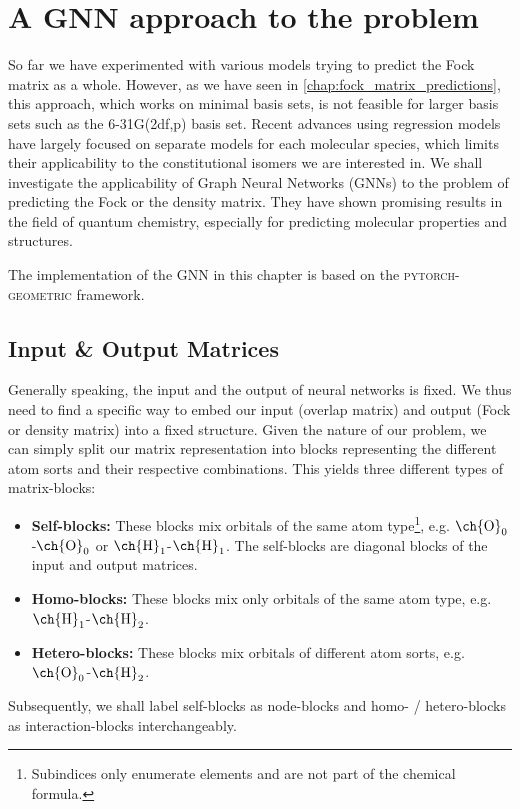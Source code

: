 \chapter{A GNN approach to the problem}
\label{chap:gnn}
So far we have experimented with various models trying to predict the Fock matrix as a whole. However, as we have seen in \autoref{chap:fock_matrix_predictions}, this approach, which works on minimal basis sets, is not feasible for larger basis sets such as the 6-31G(2df,p) basis set. Recent advances using regression models have largely focused on separate models for each molecular species, which limits their applicability to the constitutional isomers we are interested in. \parencite{ref:Hazra2024,ref:Shao2023}
We shall investigate the applicability of Graph Neural Networks (GNNs) to the problem of predicting the Fock or the density matrix. They have shown promising results in the field of quantum chemistry, especially for predicting molecular properties and structures. \parencite{ref:schnet2018}

The implementation of the GNN in this chapter is based on the \textsc{pytorch-geometric} framework. \parencite{ref:PyTorchGeometric, ref:PyTorch_geom_paper}
\section{Input \& Output Matrices}
\label{sec:gnn_input_output_matrices}
Generally speaking, the input and the output of neural networks is fixed. We thus need to find a specific way to embed our input (overlap matrix) and output (Fock or density matrix) into a fixed structure. Given the nature of our problem, we can simply split our matrix representation into blocks representing the different atom sorts and their respective combinations. This yields three different types of matrix-blocks: 
\begin{itemize}
    \item \textbf{Self-blocks:} These blocks mix orbitals of the same atom type\footnote{Subindices only enumerate elements and are not part of the chemical formula.}, e.g. $\text{\ch{O}}_0$-$\text{\ch{O}}_0$ or $\text{\ch{H}}_1$-$\text{\ch{H}}_1$. The self-blocks are diagonal blocks of the input and output matrices.
    \item \textbf{Homo-blocks:} These blocks mix only orbitals of the same atom type, e.g. $\text{\ch{H}}_1$-$\text{\ch{H}}_2$.
    \item \textbf{Hetero-blocks:} These blocks mix orbitals of different atom sorts, e.g. $\text{\ch{O}}_0$-$\text{\ch{H}}_2$.
\end{itemize}
Subsequently, we shall label self-blocks as node-blocks and homo- / hetero-blocks as interaction-blocks interchangeably. 

